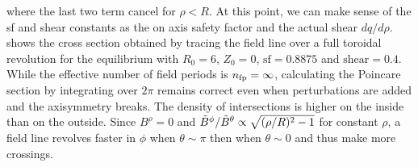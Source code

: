 where the last two term cancel for $\rho < R$. At this point, we can make sense of the sf and shear constants as the on axis safety factor and the actual shear $dq/d\rho$.  shows the cross section obtained by tracing the field line over a full toroidal revolution for the equilibrium with $R_0 = 6$, $Z_0 = 0$, $\text{sf} = 0.8875$ and $\text{shear} = 0.4$. While the effective number of field periods is $n_\text{fp} = \infty$, calculating the Poincare section by integrating over $2\pi$ remains correct even when perturbations are added and the axisymmetry breaks. The density of intersections is higher on the inside than on the outside. Since $B^\rho = 0$ and $\Tilde{B}^\phi/\tilde{B}^\theta \propto \sqrt{(\rho/R)^2-1}$ for constant $\rho$, a field line revolves faster in $\phi$ when $\theta \sim \pi$ then when $\theta \sim 0$ and thus make more crossings.

